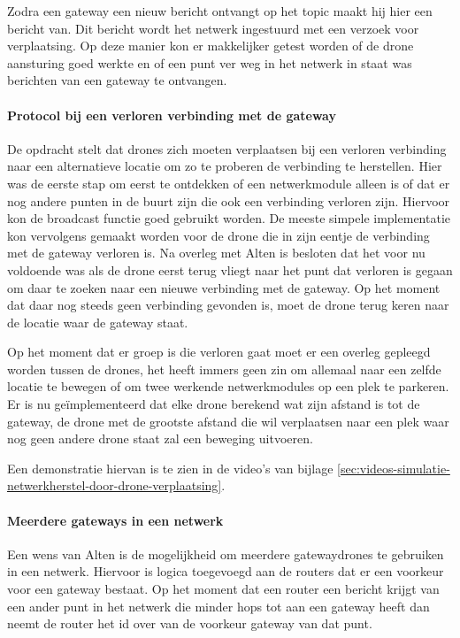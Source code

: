 \documentclass[a4paper, 11pt, oneside]{report}
\begin{document}
Zodra een gateway een nieuw bericht ontvangt op het topic maakt hij hier een bericht van. Dit bericht wordt het netwerk ingestuurd met een verzoek voor verplaatsing. Op deze manier kon er makkelijker getest worden of de drone aansturing goed werkte en of een punt ver weg in het netwerk in staat was berichten van een gateway te ontvangen.

\paragraph{Protocol bij een verloren verbinding met de gateway}
De opdracht stelt dat drones zich moeten verplaatsen bij een verloren verbinding naar een alternatieve locatie om zo te proberen de verbinding te herstellen. 
Hier was de eerste stap om eerst te ontdekken of een netwerkmodule alleen is of dat er nog andere punten in de buurt zijn die ook een verbinding verloren zijn. 
Hiervoor kon de broadcast functie goed gebruikt worden.
 De meeste simpele implementatie kon vervolgens gemaakt worden voor de drone die in zijn eentje de verbinding met de gateway verloren is. 
Na overleg met Alten is besloten dat het voor nu voldoende was als de drone eerst terug vliegt naar het punt dat verloren is gegaan om daar te zoeken naar een nieuwe verbinding met de gateway.
Op het moment dat daar nog steeds geen verbinding gevonden is, moet de drone terug keren naar de locatie waar de gateway staat.   

Op het moment dat er groep is die verloren gaat moet er een overleg gepleegd worden tussen de drones, het heeft immers geen zin om allemaal naar een zelfde locatie te bewegen of om twee werkende netwerkmodules op een plek te parkeren. 
Er is nu geïmplementeerd dat elke drone berekend wat zijn afstand is tot de gateway, de drone met de grootste afstand die wil verplaatsen naar een plek waar nog geen andere drone staat zal een beweging uitvoeren.  

Een demonstratie hiervan is te zien in de video's van bijlage \ref{sec:videos-simulatie-netwerkherstel-door-drone-verplaatsing}.
   
\paragraph{Meerdere gateways in een netwerk}
Een wens van Alten is de mogelijkheid om meerdere gatewaydrones te gebruiken in een netwerk. 
Hiervoor is logica toegevoegd aan de routers dat er een voorkeur voor een gateway bestaat.
Op het moment dat een router een bericht krijgt van een ander punt in het netwerk die minder hops tot aan een gateway heeft dan neemt de router het id over van de voorkeur gateway van dat punt. 
\end{document}
